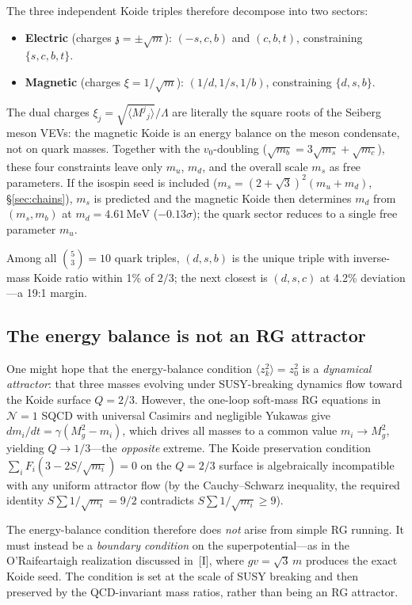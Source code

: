 \documentclass[12pt,a4paper]{article}
\newcommand{\MeV}{\,\text{MeV}}
\newcommand{\zch}{\mathfrak{z}}
\begin{document}
The three independent Koide triples therefore
decompose into two sectors:
\begin{itemize}
\item \textbf{Electric} (charges $\zch = \pm\sqrt{m}$):
$(-s,c,b)$ and $(c,b,t)$, constraining $\{s,c,b,t\}$.
\item \textbf{Magnetic} (charges $\xi = 1/\sqrt{m}$):
$(1/d,1/s,1/b)$, constraining $\{d,s,b\}$.
\end{itemize}
The dual charges $\xi_j = \sqrt{\langle M^j{}_j\rangle}/\Lambda$
are literally the square roots of the Seiberg meson VEVs:
the magnetic Koide is an energy balance on the meson
condensate, not on quark masses.
Together with the $v_0$-doubling
($\sqrt{m_b} = 3\sqrt{m_s} + \sqrt{m_c}$),
these four constraints leave only $m_u$, $m_d$, and
the overall scale $m_s$ as free parameters.
If the isospin seed is included ($m_s = (2+\sqrt{3})^2(m_u+m_d)$,
\S\ref{sec:chains}), $m_s$ is predicted and
the magnetic Koide then determines $m_d$ from $(m_s,m_b)$
at $m_d = 4.61\MeV$ ($-0.13\sigma$);
the quark sector reduces to a single free parameter $m_u$.

Among all $\binom{5}{3} = 10$ quark triples, $(d,s,b)$ is the
unique triple with inverse-mass Koide ratio within 1\% of $2/3$;
the next closest is $(d,s,c)$ at 4.2\% deviation---a 19:1 margin.

\subsection{The energy balance is not an RG attractor}

One might hope that the energy-balance condition
$\langle z_k^2\rangle = z_0^2$ is a \emph{dynamical attractor}:
that three masses evolving under SUSY-breaking dynamics flow toward
the Koide surface $Q = 2/3$. However, the one-loop soft-mass RG
equations in $\mathcal{N}=1$ SQCD with universal Casimirs and
negligible Yukawas give $dm_i/dt = \gamma(M_g^2 - m_i)$, which
drives all masses to a common value $m_i \to M_g^2$, yielding
$Q \to 1/3$---the \emph{opposite} extreme. The Koide preservation
condition $\sum_i F_i(3 - 2S/\sqrt{m_i}) = 0$ on the $Q = 2/3$
surface is algebraically incompatible with any uniform attractor
flow (by the Cauchy--Schwarz inequality, the required identity
$S\sum 1/\sqrt{m_i} = 9/2$ contradicts $S\sum 1/\sqrt{m_i} \geq 9$).

The energy-balance condition therefore does \emph{not} arise from
simple RG running. It must instead be a \emph{boundary condition}
on the superpotential---as in the O'Raifeartaigh realization
discussed in~[I], where $gv = \sqrt{3}\,m$ produces the exact
Koide seed. The condition is set at the scale of SUSY breaking and
then preserved by the QCD-invariant mass ratios, rather than being
an RG attractor.
\end{document}
